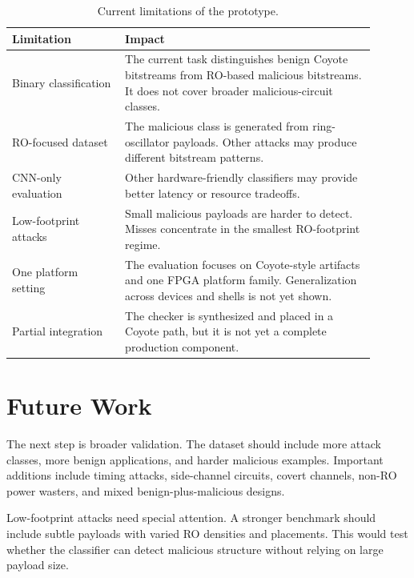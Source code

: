 \begin{table}[t]
    \centering
    \caption{Current limitations of the prototype.}
    \label{tab:limitations}
    \begin{tabular}{p{0.28\linewidth} p{0.62\linewidth}}
        \toprule
        \textbf{Limitation} & \textbf{Impact} \\
        \midrule
        Binary classification &
        The current task distinguishes benign Coyote bitstreams from RO-based malicious bitstreams. It does not cover broader malicious-circuit classes. \\
        \midrule
        RO-focused dataset &
        The malicious class is generated from ring-oscillator payloads. Other attacks may produce different bitstream patterns. \\
        \midrule
        CNN-only evaluation &
        Other hardware-friendly classifiers may provide better latency or resource tradeoffs. \\
        \midrule
        Low-footprint attacks &
        Small malicious payloads are harder to detect. Misses concentrate in the smallest RO-footprint regime. \\
        \midrule
        One platform setting &
        The evaluation focuses on Coyote-style artifacts and one FPGA platform family. Generalization across devices and shells is not yet shown. \\
        \midrule
        Partial integration &
        The checker is synthesized and placed in a Coyote path, but it is not yet a complete production component. \\
        \bottomrule
    \end{tabular}
\end{table}

\section{Future Work}
\label{sec:future-work}

The next step is broader validation. The dataset should include more attack classes, more benign applications, and harder malicious examples. Important additions include timing attacks, side-channel circuits, covert channels, non-RO power wasters, and mixed benign-plus-malicious designs.

Low-footprint attacks need special attention. A stronger benchmark should include subtle payloads with varied RO densities and placements. This would test whether the classifier can detect malicious structure without relying on large payload size.


